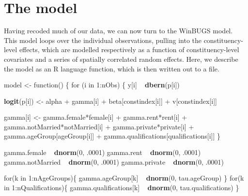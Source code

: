 \documentclass[12pt,twoside]{article}
\newenvironment{Shaded}{}{}
\newcommand{\KeywordTok}[1]{\textcolor[rgb]{0.00,0.44,0.13}{\textbf{{#1}}}}
\newcommand{\DecValTok}[1]{\textcolor[rgb]{0.25,0.63,0.44}{{#1}}}
\newcommand{\StringTok}[1]{\textcolor[rgb]{0.25,0.44,0.63}{{#1}}}
\newcommand{\NormalTok}[1]{{#1}}
\begin{document}
\section{The model}\label{the-model}

Having recoded much of our data, we can now turn to the WinBUGS model.
This model loops over the individual observations, pulling into the
constituency-level effects, which are modelled respectively as a
function of constituency-level covariates and a series of spatially
correlated random effects. Here, we describe the model as an R language
function, which is then written out to a file.

\begin{Shaded}
\begin{Highlighting}[]
\NormalTok{model <-}\StringTok{ }\NormalTok{function() \{}
    \NormalTok{for (i in }\DecValTok{1}\NormalTok{:nObs) \{}
        \NormalTok{y[i] ~}\StringTok{ }\KeywordTok{dbern}\NormalTok{(p[i])}

        \KeywordTok{logit}\NormalTok{(p[i]) <-}\StringTok{ }\NormalTok{alpha +}\StringTok{ }
\StringTok{            }\NormalTok{gamma[i] +}\StringTok{ }
\StringTok{            }\NormalTok{beta[constindex[i]] +}\StringTok{ }
\StringTok{            }\NormalTok{v[constindex[i]]}

        \NormalTok{gamma[i] <-}\StringTok{ }\NormalTok{gamma.female*female[i] +}\StringTok{ }\NormalTok{gamma.rent*rent[i] +}\StringTok{ }
\StringTok{                    }\NormalTok{gamma.notMarried*notMarried[i] +}
\StringTok{                    }\NormalTok{gamma.private*private[i] +}\StringTok{ }
\StringTok{                    }\NormalTok{gamma.ageGroup[ageGroup[i]] +}\StringTok{ }
\StringTok{                    }\NormalTok{gamma.qualifications[qualifications[i]]}
    \NormalTok{\}}

    \NormalTok{gamma.female ~}\StringTok{ }\KeywordTok{dnorm}\NormalTok{(}\DecValTok{0}\NormalTok{, .}\DecValTok{0001}\NormalTok{)}
    \NormalTok{gamma.rent ~}\StringTok{ }\KeywordTok{dnorm}\NormalTok{(}\DecValTok{0}\NormalTok{, .}\DecValTok{0001}\NormalTok{)}
    \NormalTok{gamma.notMarried ~}\StringTok{ }\KeywordTok{dnorm}\NormalTok{(}\DecValTok{0}\NormalTok{, .}\DecValTok{0001}\NormalTok{)}
    \NormalTok{gamma.private ~}\StringTok{ }\KeywordTok{dnorm}\NormalTok{(}\DecValTok{0}\NormalTok{, .}\DecValTok{0001}\NormalTok{)}

    \NormalTok{for(k in }\DecValTok{1}\NormalTok{:nAgeGroups)\{}
       \NormalTok{gamma.ageGroup[k] ~}\StringTok{ }\KeywordTok{dnorm}\NormalTok{(}\DecValTok{0}\NormalTok{, tau.ageGroup)}
      \NormalTok{\}}
    \NormalTok{for(k in }\DecValTok{1}\NormalTok{:nQualifications)\{}
       \NormalTok{gamma.qualifications[k] ~}\StringTok{ }\KeywordTok{dnorm}\NormalTok{(}\DecValTok{0}\NormalTok{, tau.qualifications)}
      \NormalTok{\}}
      


\end{Highlighting}
\end{Shaded}
\end{document}
